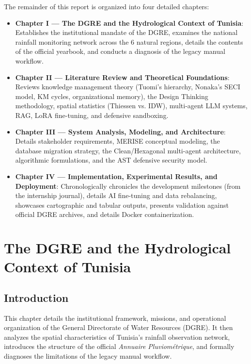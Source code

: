 \documentclass[12pt,a4paper]{report}
\begin{document}
The remainder of this report is organized into four detailed chapters:
\begin{itemize}
  \item \textbf{Chapter I --- The DGRE and the Hydrological Context of Tunisia}: Establishes the institutional mandate of the DGRE, examines the national rainfall monitoring network across the 6 natural regions, details the contents of the official yearbook, and conducts a diagnosis of the legacy manual workflow.
  \item \textbf{Chapter II --- Literature Review and Theoretical Foundations}: Reviews knowledge management theory (Tuomi's hierarchy, Nonaka's SECI model, KM cycles, organizational memory), the Design Thinking methodology, spatial statistics (Thiessen vs. IDW), multi-agent LLM systems, RAG, LoRA fine-tuning, and defensive sandboxing.
  \item \textbf{Chapter III --- System Analysis, Modeling, and Architecture}: Details stakeholder requirements, MERISE conceptual modeling, the database migration strategy, the Clean/Hexagonal multi-agent architecture, algorithmic formulations, and the AST defensive security model.
  \item \textbf{Chapter IV --- Implementation, Experimental Results, and Deployment}: Chronologically chronicles the development milestones (from the internship journal), details AI fine-tuning and data rebalancing, showcases cartographic and tabular outputs, presents validation against official DGRE archives, and details Docker containerization.
\end{itemize}

\newpage

\chapter{The DGRE and the Hydrological Context of Tunisia}

\section{Introduction}

This chapter details the institutional framework, missions, and operational organization of the General Directorate of Water Resources (DGRE). It then analyzes the spatial characteristics of Tunisia's rainfall observation network, introduces the structure of the official \textit{Annuaire Pluviométrique}, and formally diagnoses the limitations of the legacy manual workflow.
\end{document}
